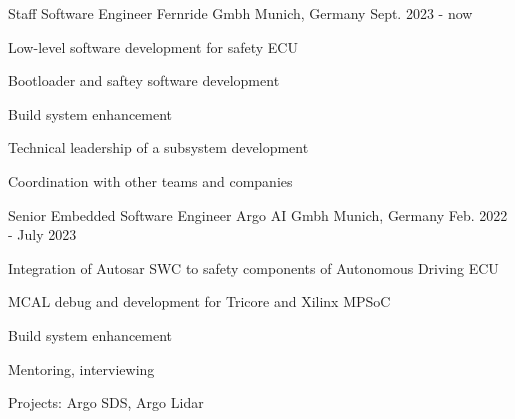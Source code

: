 


\begin{cventries}


\cventry
{Staff Software Engineer} %
{Fernride Gmbh} %
{Munich, Germany} %
{Sept. 2023 - now} %
{ %
\begin{cvitems}
\item {Low-level software development for safety ECU}
\item {Bootloader and saftey software development}
\item {Build system enhancement }
\item {Technical leadership of a subsystem development}
\item {Coordination with other teams and companies}
\end{cvitems}
}


\cventry
{Senior Embedded Software Engineer} %
{Argo AI Gmbh} %
{Munich, Germany} %
{Feb. 2022 - July 2023} %
{ %
\begin{cvitems}
\item {Integration of Autosar SWC to safety components of Autonomous Driving ECU}
\item {MCAL debug and development for Tricore and Xilinx MPSoC}
\item {Build system enhancement }
\item {Mentoring, interviewing}
\item {Projects: Argo SDS, Argo Lidar}
\end{cvitems}
}



\end{cventries}
